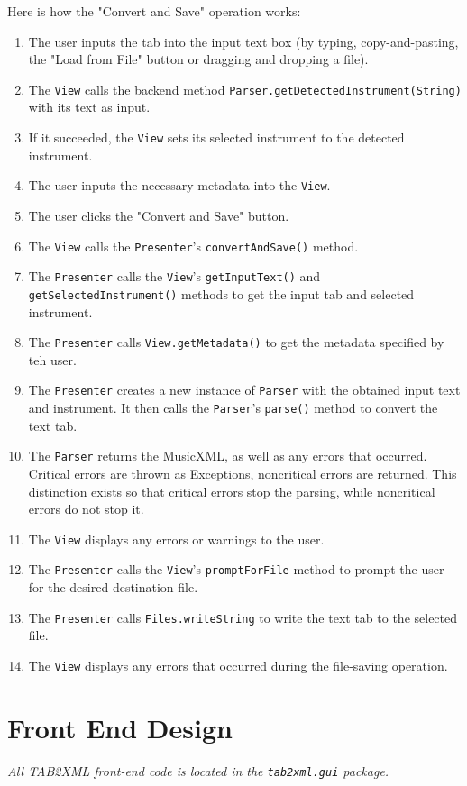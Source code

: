 \documentclass[11pt]{article}
\begin{document}
Here is how the "Convert and Save" operation works:
\begin{enumerate}
\item The user inputs the tab into the input text box (by typing, copy-and-pasting, the "Load from File" button or dragging and dropping a file).
\item The \texttt{View} calls the backend method \texttt{Parser.getDetectedInstrument(String)} with its text as input.
\item If it succeeded, the \texttt{View} sets its selected instrument to the detected instrument.
\item The user inputs the necessary metadata into the \texttt{View}.
\item The user clicks the "Convert and Save" button.
\item The \texttt{View} calls the \texttt{Presenter}'s \texttt{convertAndSave()} method.
\item The \texttt{Presenter} calls the \texttt{View}'s \texttt{getInputText()} and \texttt{getSelectedInstrument()} methods to get the input tab and selected instrument.
\item The \texttt{Presenter} calls \texttt{View.getMetadata()} to get the metadata specified by teh user.
\item The \texttt{Presenter} creates a new instance of \texttt{Parser} with the obtained input text and instrument.  It then calls the \texttt{Parser}'s \texttt{parse()} method to convert the text tab.
\item The \texttt{Parser} returns the MusicXML, as well as any errors that occurred.  Critical errors are thrown as Exceptions, noncritical errors are returned.  This distinction exists so that critical errors stop the parsing, while noncritical errors do not stop it.
\item The \texttt{View} displays any errors or warnings to the user.
\item The \texttt{Presenter} calls the \texttt{View}'s \texttt{promptForFile} method to prompt the user for the desired destination file.
\item The \texttt{Presenter} calls \texttt{Files.writeString} to write the text tab to the selected file.
\item The \texttt{View} displays any errors that occurred during the file-saving operation.
\end{enumerate}
\newpage

\section{Front End Design}
\label{sec:org119be89}
\emph{All TAB2XML front-end code is located in the \texttt{tab2xml.gui} package.}
\end{document}
